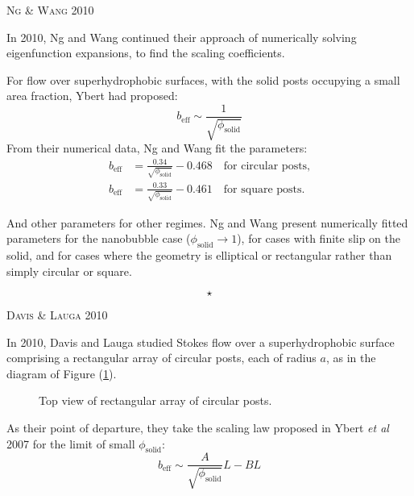 \documentclass[12pt, a4paper, twoside, openright]{book}
\newcommand{\beff}{\ensuremath{b_{\mathrm{eff}}}}
\newcommand{\phisol}{\ensuremath{\phi_{\mathrm{solid}}}}
\newcommand{\sep}{\begin{equation*} \star \end{equation*}}
\newcommand{\paper}[1]
         {\colorbox[gray]{0.8}{ \textsc{#1}}
         
         }
\begin{document}
\paper{Ng \& Wang 2010}
In 2010, Ng and Wang \cite{NgWang2010} continued their approach of numerically solving eigenfunction expansions, to find the scaling coefficients.

For flow over superhydrophobic surfaces, with the solid posts occupying a small area fraction, Ybert had proposed:
\begin{equation}
\beff \sim \frac{1}{\sqrt{\phisol}}
\end{equation}
From their numerical data, Ng and Wang fit the parameters:
\begin{align}
\beff &= \frac{0.34}{\sqrt{\phisol}} - 0.468 \quad \text{for circular posts,} \\
\beff &= \frac{0.33}{\sqrt{\phisol}} - 0.461 \quad \text{for square posts.}
\end{align}

And other parameters for other regimes.  Ng and Wang present numerically fitted parameters for the nanobubble case ($\phisol \rightarrow 1$), for cases with finite slip on the solid, and for cases where the geometry is elliptical or rectangular rather than simply circular or square.

\sep

\paper{Davis \& Lauga 2010}
In 2010, Davis and Lauga \cite{DavisLauga2010} studied Stokes flow over a superhydrophobic surface comprising a rectangular array of circular posts, each of radius $a$, as in the diagram of Figure (\ref{posts}).

\begin{figure}[ht]
\centering
{}
\caption{Top view of rectangular array of circular posts.}\label{posts}
\end{figure}

As their point of departure, they take the scaling law proposed in Ybert \emph{et al} 2007 for the limit of small $\phisol$:
\begin{equation}
\beff \sim \frac{A}{\sqrt{\phisol}} L - BL  \label{eq:DavisLauga}
\end{equation}
\end{document}
